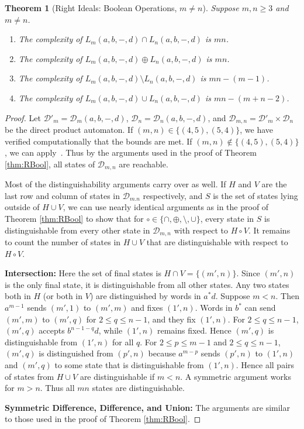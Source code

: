 \documentclass[final]{dmtcs-episciences}
\renewcommand{\le}{\leqslant}
\renewcommand{\ge}{\geqslant}
\newcommand{\noin}{\noindent}
\newcommand{\be}{\begin{enumerate}}
\newcommand{\ee}{\end{enumerate}}
\newcommand{\cD}{{\mathcal D}}
\newtheorem{theorem}{Theorem}
\theoremstyle{definition}
\theoremstyle{remark}
\begin{document}
\begin{theorem}[Right Ideals: Boolean Operations, $m\neq n$]
\label{thm:RBool2}
Suppose $m,n \ge 3$ and $m \ne n$.
\be
\item
The complexity of $L_m(a,b,-,d) \cap L_n(a,b,-,d)$ is $mn$.
\item
The complexity of $L_m(a,b,-,d) \oplus L_n(a,b,-,d)$ is $mn$.
\item
The complexity of $L_m(a,b,-,d) \setminus L_n(a,b,-,d)$ is $mn-(m-1)$.
\item
The complexity of $L_m(a,b,-,d) \cup L_n(a,b,-,d)$ is $mn-(m+n-2)$.
\ee
\end{theorem}
\begin{proof}
Let $\cD'_m = \cD_m(a,b,-,d)$, $\cD_n = \cD_n(a,b,-,d)$, and $\cD_{m,n} = \cD'_m \times \cD_n$ be the direct product automaton. 
If $(m,n) \in \{(4,5),(5,4)\}$, we have verified computationally that the bounds are met. If $(m,n) \not \in \{(4,5),(5,4)\}$,  we can apply~\cite[Theorem 1]{BBMR14}. Thus by the arguments used in the proof of Theorem \ref{thm:RBool}, all states of $\cD_{m,n}$ are reachable. 

Most of the distinguishability arguments carry over as well.
If $H$ and $V$ are the last row and column of states in $\cD_{m.n}$ respectively, and $S$ is the set of states lying outside of $H \cup V$, we can use nearly identical arguments as in the proof of Theorem \ref{thm:RBool} to show that for $\circ \in \{\cap,\oplus,\setminus,\cup\}$, every state in $S$ is distinguishable from every other state in $\cD_{m,n}$ with respect to $H \circ V$.
It remains to count the number of states in $H \cup V$ that are distinguishable with respect to $H \circ V$.

\noin\textbf{Intersection:}
Here the set of final states is $H \cap V = \{(m',n)\}$. Since $(m',n)$ is the only final state, it is distinguishable from all other states.
Any two states both in $H$ (or both in $V$) are distinguished by words in $a^*d$.
Suppose $m < n$. Then $a^{m-1}$ sends $(m',1)$ to $(m',m)$ and fixes $(1',n)$.
Words in $b^*$ can send $(m',m)$ to $(m',q)$ for $2 \le q \le n-1$, and they fix $(1',n)$.
For $2 \le q \le n-1$, $(m',q)$ accepts $b^{n-1-q}d$, while $(1',n)$ remains fixed.
Hence $(m',q)$ is distinguishable from $(1',n)$ for all $q$. 
For $2 \le p \le m-1$ and $2 \le q \le n-1$, $(m',q)$ is distinguished from $(p',n)$ because $a^{m-p}$ sends $(p',n)$ to $(1',n)$ and $(m',q)$ to some state that is distinguishable from $(1',n)$.
Hence all pairs of states from $H \cup V$ are distinguishable if $m < n$. A symmetric argument works for $m > n$. Thus all $mn$ states are distinguishable.

\noin\textbf{Symmetric Difference, Difference, and Union:}
The arguments are similar to those used in the proof of Theorem \ref{thm:RBool}. 
\end{proof}
\end{document}
